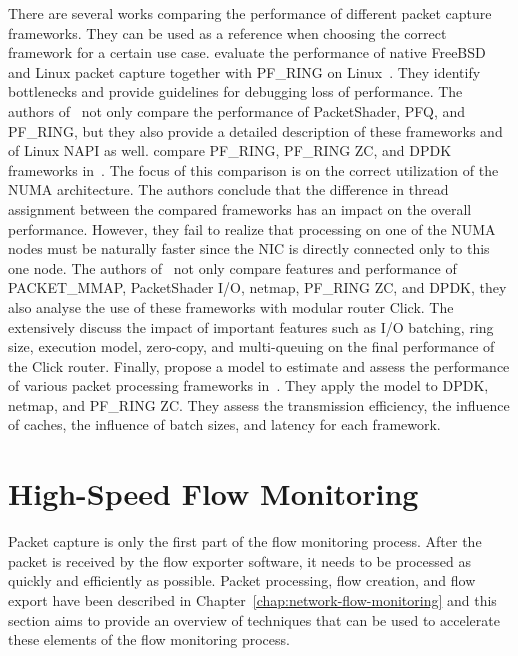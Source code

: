There are several works comparing the performance of different packet capture frameworks. They can be used as a reference when choosing the correct framework for a certain use case. \citeauthor{Braun-2010-Comparing} evaluate the performance of native FreeBSD and Linux packet capture together with PF\_RING on Linux~\cite{Braun-2010-Comparing}. They identify bottlenecks and provide guidelines for debugging loss of performance. The authors of~\cite{Garcia-Dorado-2013-High} not only compare the performance of PacketShader, PFQ, and PF\_RING, but they also provide a detailed description of these frameworks and of Linux NAPI as well. \citeauthor{Wang-2016-Comparison} compare PF\_RING, PF\_RING ZC, and DPDK frameworks in~\cite{Wang-2016-Comparison}. The focus of this comparison is on the correct utilization of the NUMA architecture. The authors conclude that the difference in thread assignment between the compared frameworks has an impact on the overall performance. However, they fail to realize that processing on one of the NUMA nodes must be naturally faster since the NIC is directly connected only to this one node. The authors of~\cite{Barbette-2015-Fast} not only compare features and performance of PACKET\_MMAP, PacketShader I/O, netmap, PF\_RING ZC, and DPDK, they also analyse the use of these frameworks with modular router Click. The extensively discuss the impact of important features such as I/O batching, ring size, execution model, zero-copy, and multi-queuing on the final performance of the Click router. Finally, \citeauthor{Gallenmueller-2015-Comparison} propose a model to estimate and assess the performance of various packet processing frameworks in~\cite{Gallenmueller-2015-Comparison}. They apply the model to DPDK, netmap, and PF\_RING ZC. They assess the transmission efficiency, the influence of caches, the influence of batch sizes, and latency for each framework.



\section{High-Speed Flow Monitoring}

Packet capture is only the first part of the flow monitoring process. After the packet is received by the flow exporter software, it needs to be processed as quickly and efficiently as possible. Packet processing, flow creation, and flow export have been described in Chapter~\ref{chap:network-flow-monitoring} and this section aims to provide an overview of techniques that can be used to accelerate these elements of the flow monitoring process. 

